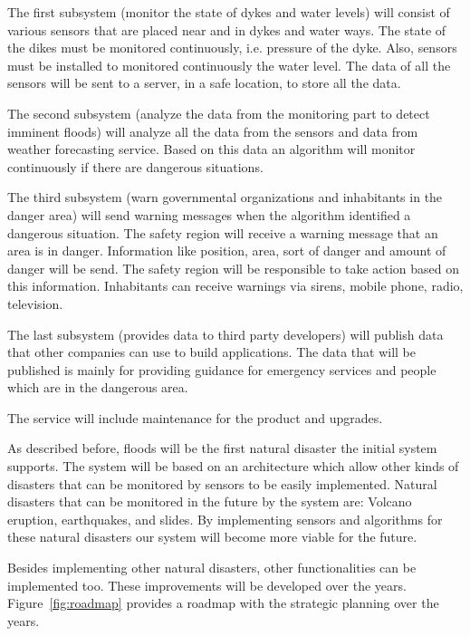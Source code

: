 The first subsystem (monitor the state of dykes and water levels) will consist of various sensors that are placed near and in dykes and water ways. The state of the dikes must be monitored continuously, i.e. pressure of the dyke. Also, sensors must be installed to monitored continuously the water level. The data of all the sensors will be sent to a server, in a safe location, to store all the data.

The second subsystem (analyze the data from the monitoring part to detect imminent floods) will analyze all the data from the sensors and data from weather forecasting service. Based on this data an algorithm will monitor continuously if there are dangerous situations.

The third subsystem (warn governmental organizations and inhabitants in the danger area) will send warning messages when the algorithm identified a dangerous situation. The safety region will receive a warning message that an area is in danger. Information like position, area, sort of danger and amount of danger will be send. The safety region will be responsible to take action based on this information. Inhabitants can receive warnings via sirens, mobile phone, radio, television. %

The last subsystem (provides data to third party developers) will publish data that other companies can use to build applications. The data that will be published is mainly for providing guidance for emergency services and people which are in the dangerous area. 

The service will include maintenance for the product and upgrades.

As described before, floods will be the first natural disaster the initial system supports. The system will be based on an architecture which allow other kinds of disasters that can be monitored by sensors to be easily implemented. Natural disasters that can be monitored in the future by the system are: Volcano eruption, earthquakes, and slides. By implementing sensors and algorithms for these natural disasters our system will become more viable for the future.

Besides implementing other natural disasters, other functionalities can be implemented too. These improvements will be developed over the years. 
Figure~\ref{fig:roadmap} provides a roadmap with the strategic planning over the years.

